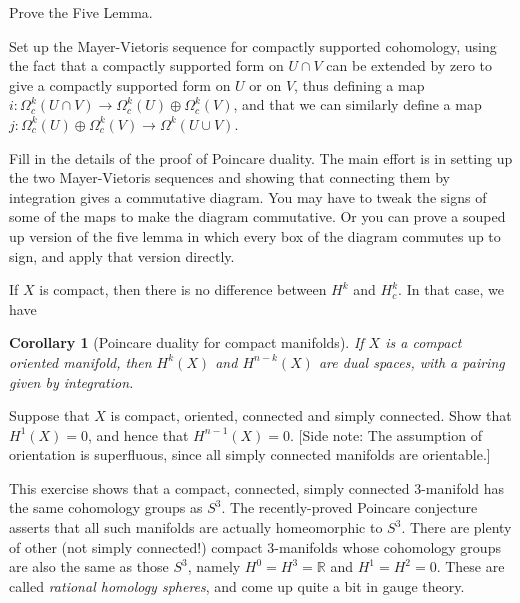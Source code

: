 \documentclass[12pt]{amsbook}
\newcommand{\R}{{\mathbb R}}
\newtheorem{cor}[thm]{Corollary}
\theoremstyle{definition}
\begin{document}
\smallskip

  Prove the Five Lemma.

\smallskip

 Set up the Mayer-Vietoris sequence 
for compactly supported cohomology, using the fact that a compactly supported
form on $U\cap V$ can be extended by zero to give a compactly supported form
on $U$ or on $V$, thus defining a map $i: \Omega^k_c(U \cap V) \to 
\Omega^k_c(U)\oplus \Omega^k_c(V)$, and that we can similarly define a map
$j: \Omega^k_c(U)\oplus \Omega^k_c(V) \to \Omega^k(U\cup V)$. 

\smallskip

  Fill in the details of the proof of
 Poincare duality. The main effort is in setting up the two Mayer-Vietoris
sequences and showing that connecting them by integration gives a 
commutative diagram. You may have to tweak the signs of some of the maps 
to make the diagram commutative. Or you can prove a souped up version
of the five lemma in which every box of the diagram commutes up to sign,
and apply that version directly. 

\smallskip
  
If $X$ is compact, then there is no difference between
 $H^k$ and $H^k_c$. In that case, we have

 \begin{cor} [Poincare duality for compact manifolds] If $X$ is a
   compact oriented manifold, then $H^k(X)$ and $H^{n-k}(X)$ are dual
   spaces, with a pairing given by integration.
  \end{cor}
    
\smallskip

 Suppose that $X$ is compact, oriented,
connected and simply connected.
Show that $H^1(X)=0$, and hence that $H^{n-1}(X)=0$. [Side note:
The assumption
of orientation is superfluous, since all simply connected manifolds are
orientable.] 

\smallskip

This exercise shows that a compact, connected, simply connected 3-manifold
has the same cohomology groups as $S^3$. The recently-proved Poincare 
conjecture asserts that all such manifolds are actually homeomorphic to $S^3$.
There are plenty of other (not simply connected!) compact 3-manifolds whose 
cohomology groups are also the same as those $S^3$, namely $H^0=H^3=\R$ and 
$H^1=H^2=0$. These are called {\em rational homology spheres}, and come up
quite a bit in gauge theory. 
\end{document}
